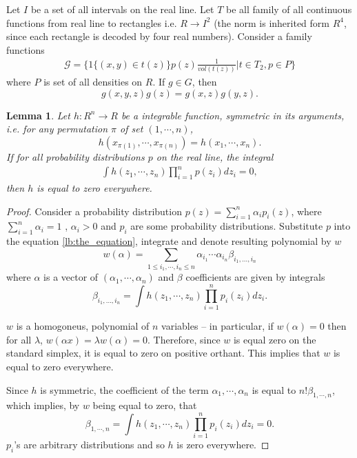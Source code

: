 \documentclass{article}
\newtheorem{lemma}{Lemma}
\begin{document}
Let $I$ be a set of all intervals on the real line. Let  $T$ be all family of all continuous functions from real line to rectangles i.e. $R \to I^2$ (the norm is inherited form $R^4$, since each rectangle is decoded by four real numbers). Consider a family functions
\begin{align}
 \mathcal G = \bigg \{ 1\{ (x,y) \in t(z) \}p(z) \frac{1}{vol(t(z))} | t \in T_2 , p \in P  \bigg \} 
\end{align}
where $P$ is set of all densities on $R$. If $g \in G$, then 
\[
g(x,y,z) g(z) = g(x,z) g(y,z). 
\]

\begin{lemma}
\label{the:Lemma}
Let $h: R^n \to R$ be a integrable function, symmetric in its arguments, i.e. for any permutation $\pi$ of set $(1,\cdots,n)$,
$$
h(x_{\pi(1)},\cdots,x_{\pi(n)}) = h(x_1,\cdots,x_n).   
$$
If for all probability distributions $p$ on the real line, the integral 
\begin{align}
\label{lb:the_equation}
\int h(z_1,\cdots,z_n) \prod_{i=1}^n p(z_i) d z_i = 0, 
\end{align}
then $h$ is equal to zero everywhere.
\end{lemma}

\begin{proof}
 Consider a probability distribution $p(z) = \sum_{i=1}^{n} \alpha_{i} p_i(z)$, where $\sum_{i=1}^n \alpha_i=1$ , $\alpha_i>0$ and $p_i$ are some probability distributions. Substitute $p$  into the  equation \ref{lb:the_equation}, integrate and denote resulting polynomial by $w$ 
 \[
  w(\alpha) = \sum_{1 \leq i_1, \cdots , i_n \leq n} \alpha_{i_1} \cdots \alpha_{i_n} \beta_{i_1,...,i_n} 
 \]
where $\alpha$ is a vector of $(\alpha_1,\cdots, \alpha_n)$ and $\beta$ coefficients are given by integrals
 \[
  \beta_{i_1,...,i_n} = \int  h(z_1,\cdots,z_n) \prod_{i=1}^n p_{i}(z_i) d z_i.
 \]
 
$w$ is a homogoneus, polynomial of $n$ variables -- in particular,  if $w(\alpha)=0$ then for all $\lambda$, $w(\alpha x)= \lambda w(\alpha)=0$.  Therefore, since $w$ is equal zero on the standard simplex, it is equal to zero on  positive orthant. This implies that $w$ is equal to zero everywhere. 

Since $h$  is symmetric, the coefficient of the term $\alpha_{1},\cdots, \alpha_{n}$ is equal to $n! \beta_{1,\cdots, n}$, which implies, by $w$ being equal to zero, that 
\[
  \beta_{1,\cdots, n} = \int  h(z_1,\cdots,z_n) \prod_{i=1}^n p_{i}(z_i) d z_i =0.
\]
$p_{i}$'s are arbitrary distributions and so  $h$ is zero everywhere.
\end{proof}
\end{document}
